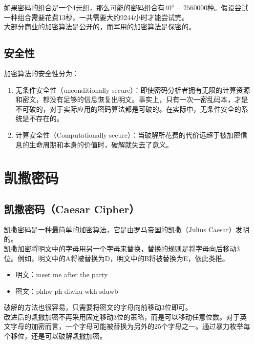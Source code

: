 如果密码的组合是一个4元组，那么可能的密码组合有$ 40^4 = 2560000 $种。假设尝试一种组合需要花费13秒，一共需要大约9244小时才能尝试完。\\

大部分商业的加密算法是公开的，而军用的加密算法是保密的。\\

\subsection{安全性}

加密算法的安全性分为：

\begin{enumerate}
    \item 无条件安全性（unconditionally secure）：即使密码分析者拥有无限的计算资源和密文，都没有足够的信息恢复出明文。事实上，只有一次一密乱码本，才是不可破的，对于实际应用的密码算法都是可破的。在实际中，无条件安全的系统是不存在的。
    \item 计算安全性（Computationally secure）：当破解所花费的代价远超于被加密信息的生命周期和本身的价值时，破解就失去了意义。
\end{enumerate}

\newpage

\section{凯撒密码}

\subsection{凯撒密码（Caesar Cipher）}

凯撒密码是一种最简单的加密算法，它是由罗马帝国的凯撒（Julius Caesar）发明的。\\

凯撒加密将明文中的字母用另一个字母来替换，替换的规则是将字母向后移动3位。例如，明文中的A将被替换为D，明文中的B将被替换为E，依此类推。

\begin{itemize}
    \item 明文：meet me after the party
    \item 密文：phhw ph diwhu wkh sduwb
\end{itemize}

破解的方法也很容易，只需要将密文的字母向前移动3位即可。\\

改进后的凯撒加密不再采用固定移动3位的策略，而是可以移动任意位数。对于英文字母的加密而言，一个字母可能被替换为另外的25个字母之一。通过暴力枚举每个移位，还是可以破解凯撒加密。\\

